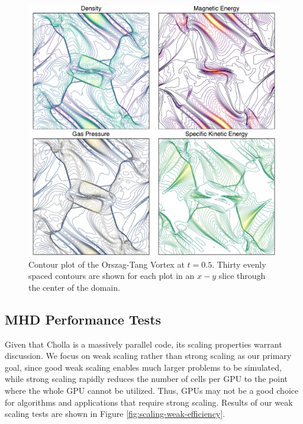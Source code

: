 \begin{figure}[!ht]
    \includegraphics[width=\linewidth]{assets/3-mhd-tests/orszag-tang-vortex.pdf}
    \caption{Contour plot of the Orszag-Tang Vortex at $t=0.5$. Thirty evenly spaced contours are shown for each plot in an $x-y$ slice through the center of the domain.  }
    \label{fig:otv}
\end{figure}

\subsection{MHD Performance Tests}
\label{sec:mhd-perf-tests}

Given that Cholla is a massively parallel code, its scaling properties warrant discussion. We focus on weak scaling rather than strong scaling as our primary goal, since good weak scaling enables much larger problems to be simulated, while strong scaling rapidly reduces the number of cells per GPU to the point where the whole GPU cannot be utilized. Thus, GPUs may not be a good choice for algorithms and applications that require strong scaling. Results of our weak scaling tests are shown in Figure \ref{fig:scaling-weak-efficiency}. 


